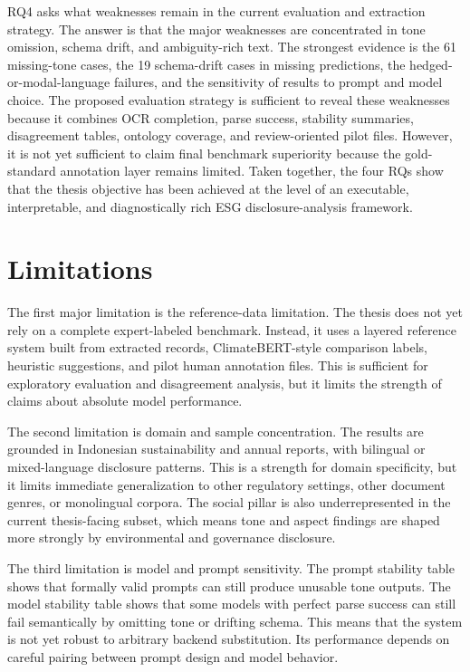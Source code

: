 \documentclass[english, online, cse, master]{dithesis}
\begin{document}
RQ4 asks what weaknesses remain in the current evaluation and extraction strategy. The answer is that the major weaknesses are concentrated in tone omission, schema drift, and ambiguity-rich text. The strongest evidence is the 61 missing-tone cases, the 19 schema-drift cases in missing predictions, the hedged-or-modal-language failures, and the sensitivity of results to prompt and model choice. The proposed evaluation strategy is sufficient to reveal these weaknesses because it combines OCR completion, parse success, stability summaries, disagreement tables, ontology coverage, and review-oriented pilot files. However, it is not yet sufficient to claim final benchmark superiority because the gold-standard annotation layer remains limited. Taken together, the four RQs show that the thesis objective has been achieved at the level of an executable, interpretable, and diagnostically rich ESG disclosure-analysis framework.



\section{Limitations}

The first major limitation is the reference-data limitation. The thesis does not yet rely on a complete expert-labeled benchmark. Instead, it uses a layered reference system built from extracted records, ClimateBERT-style comparison labels, heuristic suggestions, and pilot human annotation files. This is sufficient for exploratory evaluation and disagreement analysis, but it limits the strength of claims about absolute model performance.

The second limitation is domain and sample concentration. The results are grounded in Indonesian sustainability and annual reports, with bilingual or mixed-language disclosure patterns. This is a strength for domain specificity, but it limits immediate generalization to other regulatory settings, other document genres, or monolingual corpora. The social pillar is also underrepresented in the current thesis-facing subset, which means tone and aspect findings are shaped more strongly by environmental and governance disclosure.

The third limitation is model and prompt sensitivity. The prompt stability table shows that formally valid prompts can still produce unusable tone outputs. The model stability table shows that some models with perfect parse success can still fail semantically by omitting tone or drifting schema. This means that the system is not yet robust to arbitrary backend substitution. Its performance depends on careful pairing between prompt design and model behavior.
\end{document}
